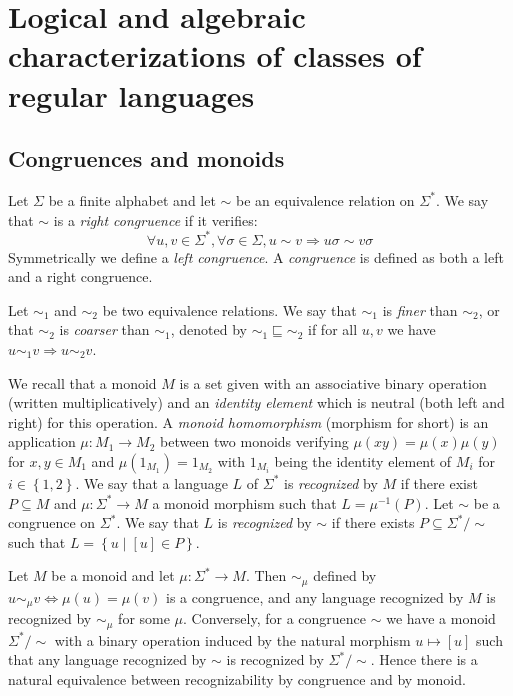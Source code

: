 \documentclass[12pt]{report}
\theoremstyle{definition}
\theoremstyle{remark}
\begin{document}
\chapter{Logical and algebraic characterizations of classes of regular languages}



\section{Congruences and monoids}

Let $\Sigma$ be a finite alphabet and let $\sim$ be an equivalence relation on $\Sigma^\ast$.
We say that $\sim$ is a \emph{right congruence} if it verifies:
$$\forall u,v\in \Sigma^\ast, \forall \sigma\in \Sigma, u\sim v\Rightarrow u\sigma\sim v\sigma $$
Symmetrically we define a \emph{left congruence}.
A \emph{congruence} is defined as both a left and a right congruence.

Let $\sim_1$ and $\sim_2$ be two equivalence relations.
We say that $\sim_1$ is \emph{finer} than $\sim_2$, or that $\sim_2$ is \emph{coarser} than $\sim_1$, denoted by ${\sim_1}\sqsubseteq{\sim_2}$ if for all $u,v$ we have $u\sim_1v\Rightarrow u\sim_2v$.

We recall that a monoid $M$ is a set given with an associative binary operation (written multiplicatively) and an \emph{identity element} which is neutral (both left and right) for this operation.
A \emph{monoid homomorphism} (morphism for short) is an application $\mu: M_1\rightarrow M_2$ between two monoids  verifying $\mu(xy)=\mu(x)\mu(y)$ for $x,y\in M_1$ and $\mu(1_{M_1})=1_{M_2}$ with $1_{M_i}$ being the identity element of $M_i$ for $i\in \left\{1,2 \right\}$.
We say that a language $L$ of $\Sigma^\ast$ is \emph{recognized} by $M$ if there exist $P\subseteq M$ and $\mu: \Sigma^\ast\rightarrow M$ a monoid morphism such that $L=\mu^{-1}(P)$.
Let $\sim$ be a congruence on $\Sigma^\ast$.
We say that $L$ is \emph{recognized} by $\sim$ if there exists $P\subseteq \Sigma^\ast/\sim$ such that $L=\left\{u\mid [u]\in P \right\}$.

Let $M$ be a monoid and let $\mu:\Sigma^\ast \rightarrow M$.
Then $\sim_\mu$ defined by $u\sim_\mu v \Leftrightarrow \mu(u)=\mu(v)$ is a congruence, and any language recognized by $M$ is recognized by $\sim_\mu$ for some $\mu$.
Conversely, for a congruence $\sim$ we have a monoid $\Sigma^\ast/\sim$ with a binary operation induced by the natural morphism $u\mapsto [u]$ such that any language recognized by $\sim$ is recognized by $\Sigma^\ast/\sim$.
Hence there is a natural equivalence between recognizability by congruence and by monoid.
\end{document}
